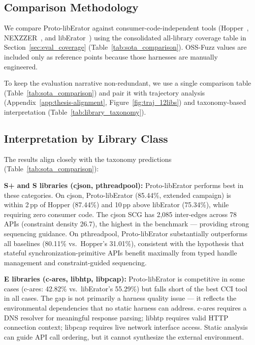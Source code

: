 \subsection{Comparison Methodology}
\label{sec:eval_cci_method}

We compare Proto-libErator against consumer-code-independent tools (Hopper~\cite{hopper_ccs23}, NEXZZER~\cite{nexzzer_ndss25}, and libErator~\cite{liberator_fse25}) using the consolidated all-library coverage table in Section~\ref{sec:eval_coverage} (Table~\ref{tab:sota_comparison}). OSS-Fuzz values are included only as reference points because those harnesses are manually engineered.

To keep the evaluation narrative non-redundant, we use a single comparison table (Table~\ref{tab:sota_comparison}) and pair it with trajectory analysis (Appendix~\ref{app:thesis-alignment}, Figure~\ref{fig:traj_12libs}) and taxonomy-based interpretation (Table~\ref{tab:library_taxonomy}).

\subsection{Interpretation by Library Class}
\label{sec:eval_cci_interpret}

The results align closely with the taxonomy predictions (Table~\ref{tab:sota_comparison}):

\textbf{S+ and S libraries (cjson, pthreadpool):} Proto-libErator performs best in these categories. On cjson, Proto-libErator (85.44\%, extended campaign) is within 2\,pp of Hopper (87.44\%) and 10\,pp above libErator (75.34\%), while requiring zero consumer code. The cjson SCG has 2,085 inter-edges across 78 APIs (constraint density 26.7), the highest in the benchmark — providing strong sequencing guidance. On pthreadpool, Proto-libErator substantially outperforms all baselines (80.11\% vs.\ Hopper's 31.01\%), consistent with the hypothesis that stateful synchronization-primitive APIs benefit maximally from typed handle management and constraint-guided sequencing.

\textbf{E libraries (c-ares, libhtp, libpcap):} Proto-libErator is competitive in some cases (c-ares: 42.82\% vs.\ libErator's 55.29\%) but falls short of the best CCI tool in all cases. The gap is not primarily a harness quality issue — it reflects the environmental dependencies that no static harness can address. c-ares requires a DNS resolver for meaningful response parsing; libhtp requires valid HTTP connection context; libpcap requires live network interface access. Static analysis can guide API call ordering, but it cannot synthesize the external environment.

